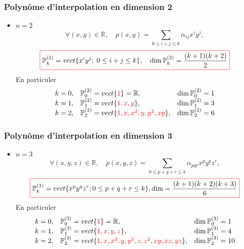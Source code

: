 \documentclass{beamer}
\newcommand{\myredbox}[1]{\fcolorbox{red}{white}{$\displaystyle#1$}}
\begin{document}

\begin{frame}
\frametitle{Polynôme d'interpolation en dimension 2}

\begin{itemize}
\item $n=2$
\[
\forall (x,y)\in\mathbb{R},\quad p(x,y)=\sum_{0\leq i+j\leq k}\alpha_{ij}x^{i}y^j,
\]
\[\myredbox{\mathbb{P}_k^{(2)}=vect\{x^iy^j;\; 0\leq i+j \leq k\}, \quad \dim \mathbb{P}_k^{(2)}=\frac{(k+1)(k+2)}{2}}\]
En particuler
\[\begin{array}{lll}
k=0, & \mathbb{P}_0^{(2)}=vect\{{\color{red}1}\}=\mathbb{R} ,&  \dim \mathbb{P}_0^{(2)}=1\\
k=1, & \mathbb{P}_1^{(2)}=vect\{{\color{red}1,x,y}\},& \dim \mathbb{P}_1^{(2)}=3\\
k=2, & \mathbb{P}_2^{(2)}=vect\{{\color{red}1,x,x^2,y,y^2,xy}\},& \dim \mathbb{P}_2^{(2)}=6
\end{array}  \]
\end{itemize}

\end{frame}


\begin{frame}
\frametitle{Polynôme d'interpolation en dimension 3}

\begin{itemize}
\item $n=3$
\[
\forall (x,y,z)\in\mathbb{R},\quad p(x,y,z)=\sum_{0\leq p+q+r\leq k}\alpha_{pqr}x^{p}y^qz^r,
\]
\[\myredbox{\mathbb{P}_k^{(3)}=vect\{x^{p}y^qz^r; 0\leq p+q+r \leq k\}, \dim =\frac{(k+1)(k+2)(k+3)}{6}}\]
En particuler
\[\begin{array}{lll}
k=0, & \mathbb{P}_0^{(3)}=vect\{{\color{red}1}\}=\mathbb{R} ,&\dim \mathbb{P}_0^{(3)}=1\\
k=1, & \mathbb{P}_1^{(3)}=vect\{{\color{red}1,x,y,z}\},& \dim \mathbb{P}_1^{(3)}=4\\
k=2, & \mathbb{P}_2^{(3)}=vect\{{\color{red}1,x,x^2,y,y^2,z,z^2,xy,xz,yz}\},& \dim \mathbb{P}_2^{(3)}=10
\end{array}  \]
\end{itemize}

\end{frame}
\end{document}
